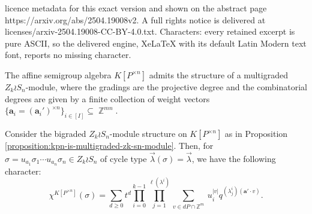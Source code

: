 \documentclass[10pt,a4paper]{amsart}
\DeclareMathOperator{\ZZ}{\mathbb{Z}}
\begin{document}
licence metadata for this exact version and shown on the abstract page https://arxiv.org/abs/2504.19008v2. A full rights notice is delivered at licenses/arxiv-2504.19008-CC-BY-4.0.txt. Characters: every retained excerpt is pure ASCII, so the delivered engine, XeLaTeX with its default Latin Modern text font, reports no missing character.
\begin{proposition}\label{proposition:kpn-is-multigraded-zk-sn-module}
    The affine semigroup algebra $K[P^{\times n}]$ admits the structure of a multigraded $Z_k \wr S_n$-module, where the gradings are the projective degree and the combinatorial degrees are given by a finite collection of weight vectors $\{\bm{a}_i = (\bm{a}_i')^{\times n}\}_{i \in [I]} \subseteq \ZZ^{mn}$.
\end{proposition}

\begin{proposition} \label{proposition:polytope-character}
    Consider the bigraded $Z_k \wr S_n$-module structure on $K[P^{\times n}]$ as in Proposition \ref{proposition:kpn-is-multigraded-zk-sn-module}. Then, for $\sigma = u_{a_1}\sigma_1 \cdots u_{a_n}\sigma_n \in Z_k \wr S_n$ of cycle type $\vec{\lambda}(\sigma) = \vec{\lambda}$, we have the following character:
    \[
    \chi^{K[P^{\times n}]}(\sigma) = \sum_{d \geq 0} t^d \prod_{i=0}^{k-1}
    \prod_{j = 1}^{\ell(\lambda^i)} \sum_{v \in dP \cap \mathbb{Z}^m} ~
    u_i^{|v|} q^{(\lambda^i_j) (\bm{a}' \cdot v)}.
    \]
\end{proposition}
\end{document}
